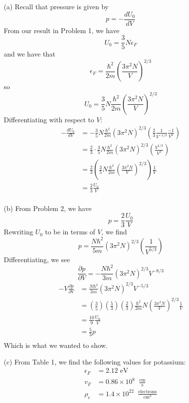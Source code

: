 \documentclass{article}
\begin{document}
\begin{itemize}
    \item[(a)] Recall that pressure is given by 
    \[p = - \frac{dU_0}{dV}\]
    From our result in Problem 1, we have
    \[U_0 = \frac{3}{5}N\epsilon_F\]
    and we have that
    \[\epsilon_F = \frac{\hbar^2}{2m}\left(\frac{3\pi^2N}{V}\right)^{2/3}\]
    so
    \[U_0 = \frac{3}{5}N\frac{\hbar^2}{2m}\left(\frac{3\pi^2N}{V}\right)^{2/3}\]
    Differentiating with respect to $V$:
    \begin{align*}
        -\frac{dU_0}{dV} &= -\frac{3}{5}N\frac{\hbar^2}{2m}(3\pi^2N)^{2/3}\left(\frac{2}{3}\frac{1}{V^{-1/3}}\frac{-1}{V^2}\right) \\
        &= \frac{2}{3}\cdot\frac{3}{5}N\frac{\hbar^2}{2m}(3\pi^2N)^{2/3}\left(\frac{V^{1/3}}{V^2}\right) \\
        &= \frac{2}{3}\left(\frac{3}{5}N\frac{\hbar^2}{2m}\left(\frac{3\pi^2N}{V}\right)^{2/3}\right)\frac{1}{V} \\
        &= \frac{2}{3}\frac{U_0}{V} \\
    \end{align*}
    
    \item[(b)] From Problem 2, we have
    \[p = \frac{2}{3}\frac{U_0}{V}\]
    Rewriting $U_0$ to be in terms of $V$, we find 
    \[p = \frac{N\hbar^2}{5m}(3\pi^2N)^{2/3}\left(\frac{1}{V^{5/3}}\right)\]
    Differentiating, we see
    \[\frac{\partial p}{\partial V} = -\frac{N\hbar^2}{3m}(3\pi^2N)^{2/3}V^{-8/3}\]
    \begin{align*}
        -V\frac{\partial p}{\partial V} &= \frac{N\hbar^2}{3m}(3\pi^2N)^{2/3}V^{-5/3} \\
        &= \left(\frac{3}{5}\right)\left(\frac{5}{3}\right)\left(\frac{2}{3}\right)\frac{\hbar^2}{2m}N\left(\frac{3\pi^2N}{V}\right)^{2/3}\frac{1}{V} \\
        &= \frac{10}{9}\frac{U_0}{V} \\
        &= \frac{5}{3}p \\
    \end{align*}
    Which is what we wanted to show.    
    
    \item[(c)] From Table 1, we find the following values for potassium:
    \begin{align*}
        \epsilon_F &= 2.12 \text{ eV} \\
        v_F &= 0.86 \times 10^8 \;\; \frac{\text{cm}}{\text{s}} \\
        \rho_e &= 1.4 \times 10^{22} \;\; \frac{\text{electrons}}{\text{cm}^3} \\
    \end{align*}
    

\end{itemize}
\end{document}
